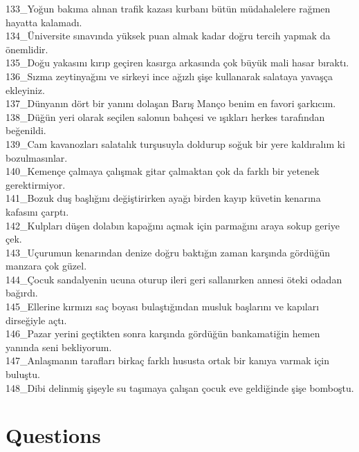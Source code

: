 \begin{myparindent}{0pt}
133\_Yoğun bakıma alınan trafik kazası kurbanı bütün müdahalelere rağmen hayatta kalamadı. \\
134\_Üniversite sınavında yüksek puan almak kadar doğru tercih yapmak da önemlidir. \\
135\_Doğu yakasını kırıp geçiren kasırga arkasında çok büyük mali hasar bıraktı. \\
136\_Sızma zeytinyağını ve sirkeyi ince ağızlı şişe kullanarak salataya yavaşça ekleyiniz. \\
137\_Dünyanın dört bir yanını dolaşan Barış Manço benim en favori şarkıcım. \\
138\_Düğün yeri olarak seçilen salonun bahçesi ve ışıkları herkes tarafından beğenildi. \\
139\_Cam kavanozları salatalık turşusuyla doldurup soğuk bir yere kaldıralım ki bozulmasınlar. \\
140\_Kemençe çalmaya çalışmak gitar çalmaktan çok da farklı bir yetenek gerektirmiyor. \\
141\_Bozuk duş başlığını değiştirirken ayağı birden kayıp küvetin kenarına kafasını çarptı. \\
142\_Kulpları düşen dolabın kapağını açmak için parmağını araya sokup geriye çek. \\
143\_Uçurumun kenarından denize doğru baktığın zaman karşında gördüğün manzara çok güzel. \\
144\_Çocuk sandalyenin ucuna oturup ileri geri sallanırken annesi öteki odadan bağırdı. \\
145\_Ellerine kırmızı saç boyası bulaştığından musluk başlarını ve kapıları dirseğiyle açtı. \\
146\_Pazar yerini geçtikten sonra karşında gördüğün bankamatiğin hemen yanında seni bekliyorum. \\
147\_Anlaşmanın tarafları birkaç farklı hususta ortak bir kanıya varmak için buluştu. \\
148\_Dibi delinmiş şişeyle su taşımaya çalışan çocuk eve geldiğinde şişe bomboştu. \\
\end{myparindent}
\section{Questions}

